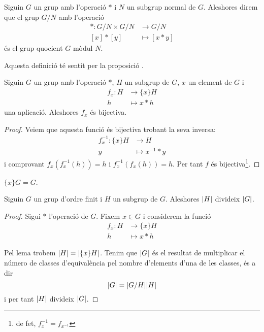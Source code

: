\documentclass[../../Main.tex]{subfiles}
\begin{document}
	\begin{definition}
		\label{def:grup quocient}\label{def:relació d'equivalència entre grups}\label{def:producte entre classes versió grups}
		Siguin \(G\) un grup amb l'operació \(\ast\) i \(N\) un subgrup normal de \(G\). Aleshores direm que el grup \(G/N\) amb l'operació
		\begin{align*}
		\ast\colon G/N\times G/N&\longrightarrow G/N\\
		[x]\ast[y]&\longmapsto[x\ast y]
		\end{align*}
		és el grup quocient \(G\) mòdul \(N\).
		
		Aquesta definició té sentit per la proposició .
	\end{definition}
	\begin{lemma}
		\label{lema:operar en grups és bijectiu}
		Siguin \(G\) un grup amb l'operació \(\ast\), \(H\) un subgrup de \(G\), \(x\) un element de \(G\) i
		\begin{align*}
		f_{x}\colon H&\longrightarrow\{x\}H\\
		h&\longmapsto x\ast h
		\end{align*}
		una aplicació. Aleshores \(f_{x}\) és bijectiva.
		\begin{proof}
			Veiem que aquesta funció és bijectiva trobant la seva inversa:
			\begin{align*}
			f_{x}^{-1}\colon\{x\}H&\longrightarrow H\\
			y&\longmapsto x^{-1}\ast y
			\end{align*}
			i comprovant \(f_{x}(f_{x}^{-1}(h))=h\) i \(f_{x}^{-1}(f_{x}(h))=h\). Per tant \(f\) és bijectiva\footnote{de fet, \(f_{x}^{-1}=f_{x^{-1}}\)}. %
		\end{proof}
	\end{lemma}
	\begin{observation}
		\(\{x\}G=G\).
	\end{observation}
	\begin{theorem}
		\label{thm:Teorema de Lagrange}
		Siguin \(G\) un grup d'ordre finit i \(H\) un subgrup de \(G\). Aleshores \(\abs{H}\) divideix \(\abs{G}\).
		\begin{proof}
			Sigui \(\ast\) l'operació de \(G\). Fixem \(x\in G\) i considerem la funció
			\begin{align*}
			f_{x}\colon H&\longrightarrow\{x\}H\\
			h&\longmapsto x\ast h
			\end{align*}
			
			Pel lema  trobem \(\abs{H}=\abs{\{x\}H}\). Tenim que \(\abs{G}\) és el resultat de multiplicar el número de classes d'equivalència pel nombre d'elements d'una de les classes, és a dir %
			\[\abs{G}=\abs{G/H}\abs{H}\]
			i per tant \(\abs{H}\) divideix \(\abs{G}\).
		\end{proof}
	\end{theorem}
\end{document}
